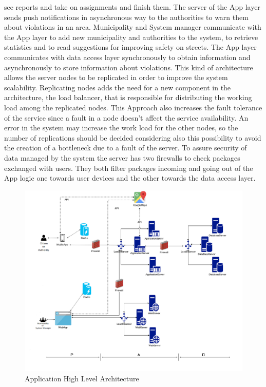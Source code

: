 see reports and take on assignments and finish them. The server of the App layer sends push
notifications in asynchronous way to the authorities to warn them about violations in an area. Municipality
and System manager communicate with the App layer to add new municipality and authorities to the system, to retrieve statistics and to read suggestions for improving safety on streets. The App layer
communicates with data access layer synchronously to obtain information and asynchronously to store
information about violations. This kind of architecture allows the server nodes to be replicated in order to improve
the system scalability. Replicating nodes adds the need for a new component in the architecture, the load
balancer, that is responsible for distributing the working load among the replicated nodes. This Approach also increases the fault tolerance of the service since a fault in a node doesn’t affect the
service availability. An error in the system may increase the work load for the other nodes, so the number of
replications should be decided considering also this possibility to avoid the creation of a bottleneck due
to a fault of the server. To assure security of data managed by the system the server has two firewalls to
check packages exchanged with users. They both filter packages incoming and going out of the App logic
one towards user devices and the other towards the data access layer.
\newpage
\begin{figure}[H]
\centering
\includegraphics[width=\textwidth]{Images/Architecture.png}
\caption{\label{fig:ComWI}Application High Level Architecture}
\end{figure}
